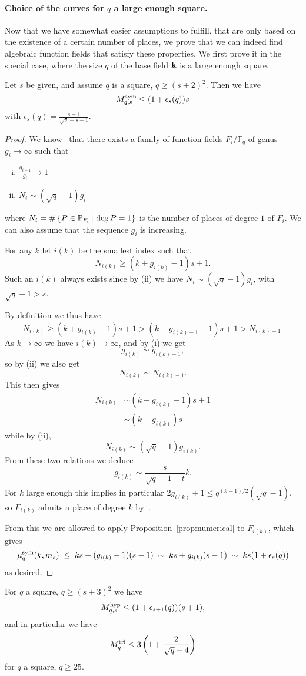 \paragraph{Choice of the curves for $q$ a large enough square.}
Now that we have somewhat easier assumptions to fulfill, that are only based on
the existence of a certain number of places, we prove that we can indeed find
algebraic function fields that satisfy these properties. We first prove it in the
special case, where the size $q$ of the base field $\mathbf{k}$ is a large enough
square.
\begin{prop}
\label{prop:asymptsquare}
Let $s$ be given, and assume $q$ is a square, $q\geq(s+2)^2$.
Then we have
\[
M^{\textrm{sym}}_{q,s}\leq(1+\epsilon_s(q))s
\]
with $\epsilon_s(q)=\frac{s-1}{\sqrt{q}-s-1}$.
\end{prop}
\begin{proof}
We know~\cite{STV92} that there exists a family of function fields
$F_i/\mathbb{F}_q$ of genus $g_i\to\infty$ such that
\begin{enumerate}[(i)]
  \item $\frac{g_{i+1}}{g_i}\to1$
  \item $N_i\sim (\sqrt q - 1)g_i$
\end{enumerate}
where $N_i = \#\left\{ P\in\mathbb{P}_{F_i}\,|\,\deg P = 1 \right\}$
is the number of places of degree $1$ of $F_i$. We can also assume that the sequence
$g_i$ is increasing. 

For any $k$ let $i(k)$ be the smallest index such that
\[ N_{i(k)} \geq (k + g_{i(k)}-1)s +1. \]
Such an $i(k)$ always exists since by (ii) we have $N_i\sim (\sqrt q - 1)g_i$,
with $\sqrt q - 1>s$.

By definition we thus have
\[ N_{i(k)} \geq (k + g_{i(k)}-1)s +1 > (k + g_{i(k)-1}-1)s +1 > N_{i(k)-1}. \]
As $k\to\infty$ we have $i(k)\to\infty$, and by (i) we get 
\[
  g_{i(k)}\sim g_{i(k)-1},
\]
so by (ii) we also get 
\[
  N_{i(k)}\sim N_{i(k)-1}.
\]
This then gives
\[ \begin{split} N_{i(k)} &\sim (k + g_{i(k)}-1)s +1\\ &\sim (k + g_{i(k)})s \end{split} \]
while by (ii),
\[ N_{i(k)} \sim (\sqrt q - 1)g_{i(k)}. \]
From these two relations we deduce
\[ g_{i(k)} \sim \frac{s}{\sqrt{q}-1-t}k. \]
For $k$ large enough this implies in particular $2g_{i(k)} +1 \leq q^{(k-1)/2}(\sqrt q-1)$,
so $F_{i(k)}$ admits a place of degree $k$ by~\cite[Cor.~5.2.10]{Stichtenoth09}.

From this we are allowed to apply Proposition~\ref{prop:numerical} to $F_{i(k)}$, which gives
\[ \mu^{\textrm{sym}}_q(k,m_s)\;\leq\; ks+(g_{i(k)}-1)(s-1)\;\sim\; ks+g_{i(k)}(s-1)\;\sim\; ks(1+\epsilon_s(q)) \]
as desired.
\end{proof}
\begin{cor}
\label{cor:asymptsquare}
For $q$ a square, $q\geq(s+3)^2$ we have
\[
M^{\textrm{hyp}}_{q,s}\leq(1+\epsilon_{s+1}(q))(s+1),
\]
and in particular we have
\[ M^{\textrm{tri}}_q\leq 3\left(1+\frac{2}{\sqrt{q}-4}\right) \]
for $q$ a square, $q\geq 25$.
\end{cor}

